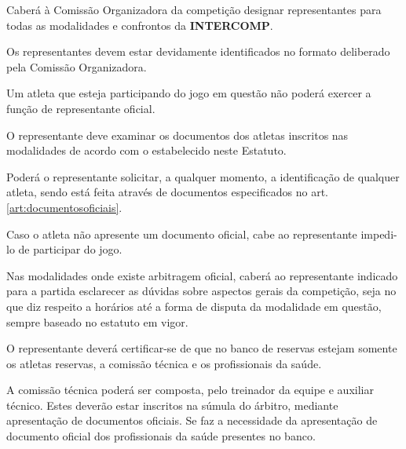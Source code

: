\begin{article}
	Caberá à Comissão Organizadora da competição designar representantes para todas as modalidades e confrontos da \textbf{INTERCOMP}.
\end{article}

\begin{article}
	Os representantes devem estar devidamente identificados no formato deliberado pela Comissão Organizadora.
\end{article}

\begin{article}
	Um atleta que esteja participando do jogo em questão não poderá exercer a função de representante oficial.
\end{article}

\begin{article}
    \label{art:representantedocumentos}
	O representante deve examinar os documentos dos atletas inscritos nas modalidades de acordo com o estabelecido neste Estatuto.

	\begin{xparagraph}
	    Poderá o representante solicitar, a qualquer momento, a identificação de qualquer atleta, sendo está feita através de documentos especificados no art. \ref{art:documentosoficiais}\ulo.
	\end{xparagraph}

	\begin{xparagraph}
	    Caso o atleta não apresente um documento oficial, cabe ao representante impedi-lo de participar do jogo.
	\end{xparagraph}
\end{article}

\begin{article}
	Nas modalidades onde existe arbitragem oficial, caberá ao representante indicado para a partida esclarecer as dúvidas sobre aspectos gerais da competição, seja no que diz respeito a horários até a forma de disputa da modalidade em questão, sempre baseado no estatuto em vigor.
\end{article}

\begin{article}
	O representante deverá certificar-se de que no banco de reservas estejam somente os atletas reservas, a comissão técnica e os profissionais da saúde.

	\begin{xparagraph}
	    A comissão técnica poderá ser composta, pelo treinador da equipe e auxiliar técnico. Estes deverão estar inscritos na súmula do árbitro, mediante apresentação de documentos oficiais. Se faz a necessidade da apresentação de documento oficial dos profissionais da saúde presentes no banco.
	\end{xparagraph}
\end{article}

